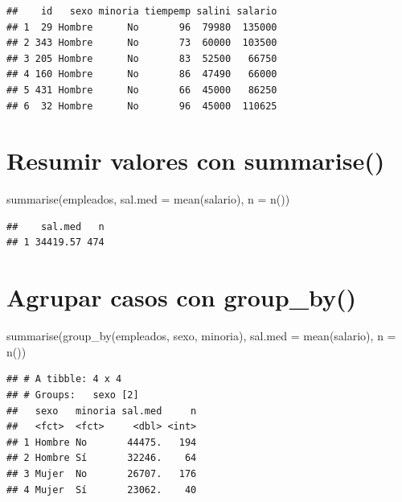 \documentclass[
]{book}
\newenvironment{Shaded}{\begin{snugshade}}{\end{snugshade}}
\newcommand{\AttributeTok}[1]{\textcolor[rgb]{0.77,0.63,0.00}{#1}}
\newcommand{\FunctionTok}[1]{\textcolor[rgb]{0.00,0.00,0.00}{#1}}
\newcommand{\NormalTok}[1]{#1}
\theoremstyle{break}
\begin{document}
\begin{verbatim}
##    id   sexo minoria tiempemp salini salario
## 1  29 Hombre      No       96  79980  135000
## 2 343 Hombre      No       73  60000  103500
## 3 205 Hombre      No       83  52500   66750
## 4 160 Hombre      No       86  47490   66000
## 5 431 Hombre      No       66  45000   86250
## 6  32 Hombre      No       96  45000  110625
\end{verbatim}

\hypertarget{resumir-valores-con-summarise}{%
\section{\texorpdfstring{Resumir valores con \textbf{summarise()}}{Resumir valores con summarise()}}\label{resumir-valores-con-summarise}}

\begin{Shaded}
\begin{Highlighting}[]
\FunctionTok{summarise}\NormalTok{(empleados, }\AttributeTok{sal.med =} \FunctionTok{mean}\NormalTok{(salario), }\AttributeTok{n =} \FunctionTok{n}\NormalTok{())}
\end{Highlighting}
\end{Shaded}

\begin{verbatim}
##    sal.med   n
## 1 34419.57 474
\end{verbatim}

\hypertarget{agrupar-casos-con-group_by}{%
\section{\texorpdfstring{Agrupar casos con \textbf{group\_by()}}{Agrupar casos con group\_by()}}\label{agrupar-casos-con-group_by}}

\begin{Shaded}
\begin{Highlighting}[]
\FunctionTok{summarise}\NormalTok{(}\FunctionTok{group\_by}\NormalTok{(empleados, sexo, minoria), }\AttributeTok{sal.med =} \FunctionTok{mean}\NormalTok{(salario), }\AttributeTok{n =} \FunctionTok{n}\NormalTok{())}
\end{Highlighting}
\end{Shaded}

\begin{verbatim}
## # A tibble: 4 x 4
## # Groups:   sexo [2]
##   sexo   minoria sal.med     n
##   <fct>  <fct>     <dbl> <int>
## 1 Hombre No       44475.   194
## 2 Hombre Sí       32246.    64
## 3 Mujer  No       26707.   176
## 4 Mujer  Sí       23062.    40
\end{verbatim}
\end{document}
